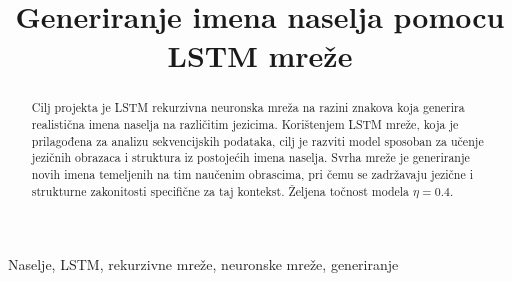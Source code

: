 \documentclass[conference]{IEEEtran}
\begin{document}
\title{Generiranje imena naselja pomocu LSTM mreže}


\author{
\and
{}
\and
{}
\and
{}
\and
{}
\and
{}
}

\maketitle

\begin{abstract}
Cilj projekta je LSTM rekurzivna neuronska mreža na razini znakova koja generira realistična imena naselja na različitim jezicima. Korištenjem LSTM mreže, koja je prilagođena za analizu sekvencijskih podataka, cilj je razviti model sposoban za učenje jezičnih obrazaca i struktura iz postojećih imena naselja. Svrha mreže je generiranje novih imena temeljenih na tim naučenim obrascima, pri čemu se zadržavaju jezične i strukturne zakonitosti specifične za taj kontekst.
Željena točnost modela $\eta = 0.4$.
\end{abstract}

\begin{IEEEkeywords}
Naselje, LSTM, rekurzivne mreže, neuronske mreže, generiranje
\end{IEEEkeywords}
\end{document}
